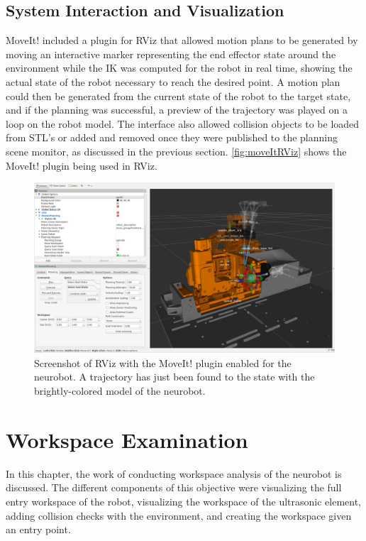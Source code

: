 \documentclass[12pt]{report}
\begin{document}
\section{System Interaction and Visualization}
MoveIt! included a plugin for RViz that allowed motion plans to be generated by moving an interactive marker representing the end effector state around the environment while the IK was computed for the robot in real time, showing the actual state of the robot necessary to reach the desired point. A motion plan could then be generated from the current state of the robot to the target state, and if the planning was successful, a preview of the trajectory was played on a loop on the robot model. The interface also allowed collision objects to be loaded from STL's or added and removed once they were published to the planning scene monitor, as discussed in the previous section. \autoref{fig:moveItRViz} shows the MoveIt! plugin being used in RViz.

\begin{figure}[thpb]
	\centering
	\includegraphics[width=\textwidth]{images/moveit_rviz_plugin_neurobot.png}
    \caption{Screenshot of RViz with the MoveIt! plugin enabled for the neurobot. A trajectory has just been found to the state with the brightly-colored model of the neurobot.}
    \label{fig:moveItRViz}
\end{figure}


\chapter{Workspace Examination}
In this chapter, the work of conducting workspace analysis of the neurobot is discussed. The different components of this objective were visualizing the full entry workspace of the robot, visualizing the workspace of the ultrasonic element, adding collision checks with the environment, and creating the workspace given an entry point. 
\end{document}
